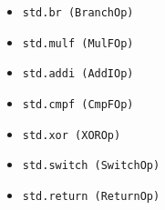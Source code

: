 \documentclass{beamer}
\begin{document}
\begin{frame}
\begin{columns}
\begin{column}{0.5\textwidth}
{\begin{itemize}
          \item \texttt{std.br   (BranchOp)}
          \item \texttt{std.mulf (MulFOp)}
          \item \texttt{std.addi (AddIOp)}
          \item \texttt{std.cmpf (CmpFOp)}
          \item \texttt{std.xor  (XOROp)}
          \item \texttt{std.switch (SwitchOp)}
          \item \texttt{std.return (ReturnOp)}
        \end{itemize}
      }
    \end{column}
  \end{columns}
\end{frame}
\end{document}

